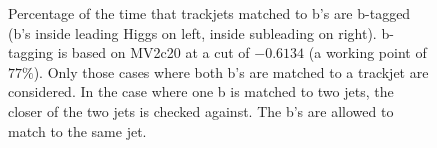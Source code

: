 \begin{figure}[htbp!]
\begin{center}
\qquad
\caption{Percentage of the time that trackjets matched to b's are b-tagged (b's inside leading Higgs on left, inside subleading on right). b-tagging is based on MV2c20 at a cut of $-0.6134$ (a working point of $77\%$). Only those cases where both b's are matched to a trackjet are considered. In the case where one b is matched to two jets, the closer of the two jets is checked against. The b's are allowed to match to the same jet.}
\label{fig:app-truth-bbtag}
\end{center}
\end{figure}
